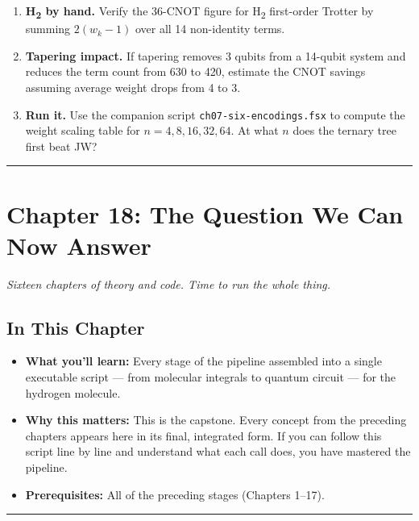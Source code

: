 \documentclass[
  11pt,
  oneside]{book}
\providecommand{\tightlist}{%
  \setlength{\itemsep}{0pt}\setlength{\parskip}{0pt}}
\begin{document}
\begin{enumerate}
\def\labelenumi{\arabic{enumi}.}
\item
  \textbf{H\textsubscript{2} by hand.} Verify the 36-CNOT figure for H\textsubscript{2} first-order
  Trotter by summing \(2(w_k - 1)\) over all 14 non-identity terms.
\item
  \textbf{Tapering impact.} If tapering removes 3 qubits from a 14-qubit
  system and reduces the term count from 630 to 420, estimate the CNOT
  savings assuming average weight drops from 4 to 3.
\item
  \textbf{Run it.} Use the companion script
  \texttt{ch07-six-encodings.fsx} to compute the weight scaling
  table for \(n = 4, 8, 16, 32, 64\). At what \(n\) does the ternary
  tree first beat JW?
\end{enumerate}

\begin{center}\rule{0.5\linewidth}{0.5pt}\end{center}

\chapter{Chapter 18: The Question We Can Now
Answer}\label{chapter-18-the-question-we-can-now-answer}

\emph{Sixteen chapters of theory and code. Time to run the whole thing.}

\section{In This Chapter}\label{in-this-chapter-17}

\begin{itemize}
\tightlist
\item
  \textbf{What you'll learn:} Every stage of the pipeline assembled into
  a single executable script --- from molecular integrals to quantum
  circuit --- for the hydrogen molecule.
\item
  \textbf{Why this matters:} This is the capstone. Every concept from
  the preceding chapters appears here in its final, integrated form. If
  you can follow this script line by line and understand what each call
  does, you have mastered the pipeline.
\item
  \textbf{Prerequisites:} All of the preceding stages (Chapters 1--17).
\end{itemize}

\begin{center}\rule{0.5\linewidth}{0.5pt}\end{center}
\end{document}

